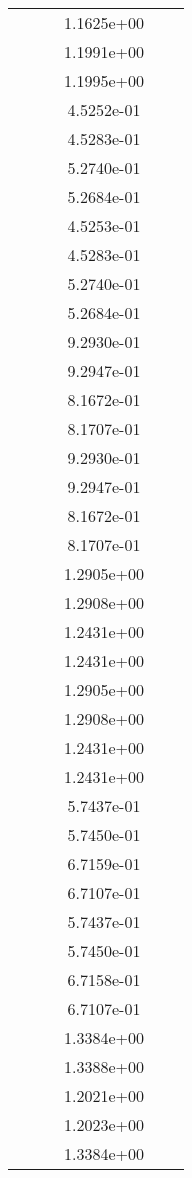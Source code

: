 \begin{xltabular}{\textwidth}{r|rS[table-format=1.3e+2]S[table-format=1.4e+2]S[table-format=1.4e+2]S[table-format=-1.5]}
&  &  & 1.1625e+00 & & \\
&  &  & 1.1991e+00 & & \\
&  &  & 1.1995e+00 & & \\
&  &  & 4.5252e-01 & & \\
&  &  & 4.5283e-01 & & \\
&  &  & 5.2740e-01 & & \\
&  &  & 5.2684e-01 & & \\
&  &  & 4.5253e-01 & & \\
&  &  & 4.5283e-01 & & \\
&  &  & 5.2740e-01 & & \\
&  &  & 5.2684e-01 & & \\
&  &  & 9.2930e-01 & & \\
&  &  & 9.2947e-01 & & \\
&  &  & 8.1672e-01 & & \\
&  &  & 8.1707e-01 & & \\
&  &  & 9.2930e-01 & & \\
&  &  & 9.2947e-01 & & \\
&  &  & 8.1672e-01 & & \\
&  &  & 8.1707e-01 & & \\
&  &  & 1.2905e+00 & & \\
&  &  & 1.2908e+00 & & \\
&  &  & 1.2431e+00 & & \\
&  &  & 1.2431e+00 & & \\
&  &  & 1.2905e+00 & & \\
&  &  & 1.2908e+00 & & \\
&  &  & 1.2431e+00 & & \\
&  &  & 1.2431e+00 & & \\
&  &  & 5.7437e-01 & & \\
&  &  & 5.7450e-01 & & \\
&  &  & 6.7159e-01 & & \\
&  &  & 6.7107e-01 & & \\
&  &  & 5.7437e-01 & & \\
&  &  & 5.7450e-01 & & \\
&  &  & 6.7158e-01 & & \\
&  &  & 6.7107e-01 & & \\
&  &  & 1.3384e+00 & & \\
&  &  & 1.3388e+00 & & \\
&  &  & 1.2021e+00 & & \\
&  &  & 1.2023e+00 & & \\
&  &  & 1.3384e+00 & & \\

\end{xltabular}
